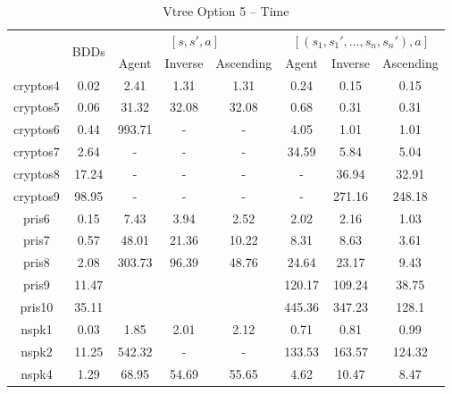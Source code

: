 \documentclass[11pt]{article}
\begin{document}
\begin{table}
\centering
\begin{tabular}{|*{8}{c|}}
\hline
& \multirow{2}{*}{BDDs} & \multicolumn{3}{c|}{$[s, s', a]$}& \multicolumn{3}{c|}{$[(s_1, s_1', ..., s_n, s_n'), a]$}\\ \cline{3-8}
& & Agent & Inverse & Ascending & Agent & Inverse &  Ascending \\ \hline
cryptos4 & 0.02 & 2.41 & 1.31 & 1.31& 0.24 & 0.15 & 0.15 \\ \hline
cryptos5 & 0.06 & 31.32 & 32.08 & 32.08&0.68& 0.31 & 0.31 \\ \hline
cryptos6 & 0.44 & 993.71& - & - & 4.05 & 1.01 & 1.01 \\ \hline
cryptos7 & 2.64 & - & - & - & 34.59 & 5.84 & 5.04\\ \hline
cryptos8 & 17.24 & - & - & - & - & 36.94 & 32.91 \\ \hline
cryptos9 & 98.95 & - & - & - & - & 271.16 & 248.18\\ \hline
pris6 & 0.15 & 7.43 & 3.94 & 2.52 & 2.02 & 2.16 & 1.03 \\ \hline
pris7 & 0.57 & 48.01 & 21.36 & 10.22& 8.31 & 8.63 & 3.61 \\ \hline
pris8 & 2.08 & 303.73 & 96.39 & 48.76 & 24.64 & 23.17 & 9.43 \\ \hline
pris9 & 11.47 &  &  &  & 120.17& 109.24 & 38.75 \\ \hline
pris10 & 35.11 &  &  &  & 445.36& 347.23 & 128.1\\ \hline
nspk1 & 0.03 & 1.85 & 2.01 & 2.12 & 0.71 &0.81&  0.99\\ \hline
nspk2 & 11.25 & 542.32& - & - & 133.53 & 163.57 &  124.32\\ \hline
nspk4 & 1.29 & 68.95 &54.69 & 55.65 & 4.62 & 10.47 & 8.47\\ \hline
\end{tabular}
\caption{Vtree Option 5 -- Time}
\label{table:vtree5time}
\end{table}
\end{document}
